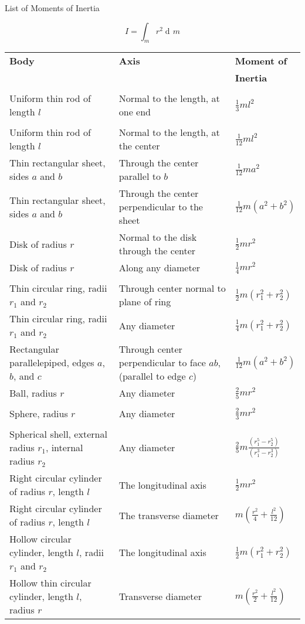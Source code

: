 \documentclass{article}
\DeclareMathOperator{\dif}{d \!} %
\begin{document}
\begin{center}
\begin{LARGE}
List of Moments of Inertia
\end{LARGE}
\end{center}

$$
I = \int_m r^2 \dif m
$$

\begin{tabular}{p{1.75in}|p{2in}|l}
\hline
\textbf{Body} & \textbf{Axis} & \textbf{Moment of} \\
& & \textbf{Inertia} \\
\hline
\hline & &\\
Uniform thin rod of length $l$ & Normal to the length, at one end & $\frac{1}{3} m l^2$ \\
& &\\
Uniform thin rod of length $l$ & Normal to the length, at the center & $\frac{1}{12} m l^2$ \\

Thin rectangular sheet, sides $a$ and $b$ & Through the center parallel to $b$ & $\frac{1}{12} m a^2$ \\
Thin rectangular sheet, sides $a$ and $b$ & Through the center perpendicular to the sheet & $\frac{1}{12} m \left(a^2 + b^2\right)$ \\
Disk of radius $r$ & Normal to the disk through the center & $\frac{1}{2}mr^2$ \\
Disk of radius $r$ & Along any diameter & $\frac{1}{4}mr^2$ \\
& &\\
Thin circular ring, radii $r_1$ and $r_2$ & Through center normal to plane of ring & $\frac{1}{2}m\left(r_1^2 + r_2^2\right)$ \\
Thin circular ring, radii $r_1$ and $r_2$ & Any diameter & $\frac{1}{4}m\left(r_1^2 + r_2^2\right)$ \\
Rectangular parallelepiped, edges $a$, $b$, and $c$ & Through center perpendicular to face $ab$, (parallel to edge $c$) & $\frac{1}{12}m\left(a^2 + b^2\right)$ \\
Ball, radius $r$ & Any diameter & $\frac{2}{5}mr^2$ \\
& &\\
Sphere, radius $r$ & Any diameter & $\frac{2}{3}mr^2$ \\
& &\\
Spherical shell, external radius $r_1$, internal radius $r_2$ & Any diameter & $\frac{2}{5}m\frac{\left(r_1^5 - r_2^5\right)}{\left(r_1^3 - r_2^3\right)}$ \\
Right circular cylinder of radius $r$, length $l$ & The longitudinal axis & $\frac{1}{2}mr^2$ \\
Right circular cylinder of radius $r$, length $l$ & The transverse diameter & $m\left(\frac{r^2}{4} + \frac{l^2}{12}\right)$ \\
Hollow circular cylinder, length $l$, radii $r_1$ and $r_2$ & The longitudinal axis & $\frac{1}{2}m\left(r_1^2 + r_2^2\right)$ \\
Hollow thin circular cylinder, length $l$, radius $r$ & Transverse diameter & $m\left(\frac{r^2}{2} + \frac{l^2}{12}\right)$ \\
\end{tabular}
\end{document}
